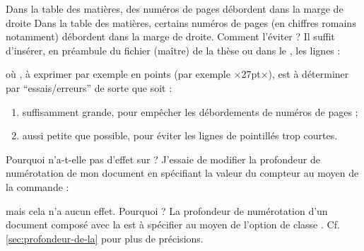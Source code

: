 \begin{dbfaq}{Dans la table des matières, des numéros de pages débordent dans
    la marge de droite}{}
  Dans la table des matières, certains numéros de pages (en chiffres romains
  notamment) débordent dans la marge de droite. Comment l'éviter ?
  \tcblower
  Il suffit d'insérer, en préambule du fichier (maître) de la thèse ou dans le
  \File{\configurationfile}, les lignes :
\begin{preamblecode}
\makeatletter
\renewcommand*\@pnumwidth{÷\meta{distance}÷}
\makeatother
\end{preamblecode}
où , à exprimer par exemple en points (par exemple ×27pt×), est
à déterminer par \enquote{essais/erreurs} de sorte que  soit :
\begin{enumerate}
\item suffisamment grande, pour empêcher les débordements de numéros de pages ;
\item aussi petite que possible, pour éviter les lignes de pointillés trop
  courtes.
\end{enumerate}
\end{dbfaq}

\begin{dbfaq}{Pourquoi \protect{} n'a-t-elle pas
    d'effet sur \protect{} ?}{}
  J'essaie de modifier la profondeur de numérotation de mon document en
  spécifiant la valeur du compteur  au moyen de la
  commande :
\begin{preamblecode}
\end{preamblecode}
  mais cela n'a aucun effet. Pourquoi ?
  \tcblower
  La profondeur de numérotation d'un document composé avec la \yatcl{} est
  à spécifier au moyen de l'option de classe
  . Cf. \vref{sec:profondeur-de-la} pour plus de
  précisions.
\end{dbfaq}

%
\iffalse
\fi
